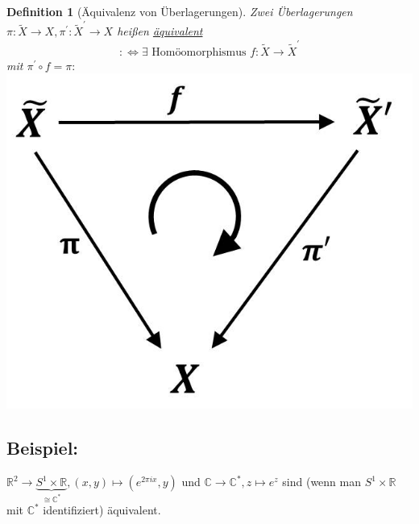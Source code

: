 \documentclass[a4paper,11pt,notitlepage]{report}
\newtheorem{definition}{Definition}[chapter]
\newcommand{\R}{{\ensuremath{\mathbb{R}}}}
\newcommand{\C}{{\ensuremath{\mathbb{C}}}}
\newenvironment{bsp}[1]
{
\setlength{\fboxsep}{10pt}
\subsection*{Beispiel: #1}
\begin{upshape}
}
{
\end{upshape}
}
\begin{document}
\begin{definition}[Äquivalenz von Überlagerungen]
	Zwei Überlagerungen $\pi \colon \tilde{X} \rightarrow X, \pi^\prime \colon \tilde{X}^\prime \rightarrow X$ heißen \underline{äquivalent}
	$$:\Leftrightarrow \exists \text{ Homöomorphismus } f \colon \tilde{X} \rightarrow \tilde{X}^\prime$$
	mit $\pi^\prime \circ f = \pi:$
	\newline \includegraphics[scale=0.4]{images/Aequivalenz_Ueberlagerungen.jpg}
\end{definition}

\begin{bsp}{}
	$\R^2 \rightarrow \underbrace{S^1 \times \R}_{\cong \C^*}, (x,y) \mapsto (e^{2 \pi i x}, y)$
	und $\C \rightarrow \C^*, z \mapsto e^z$
	sind (wenn man $S^1 \times \R$ mit $\C^*$ identifiziert) äquivalent.
\end{bsp}
\end{document}

